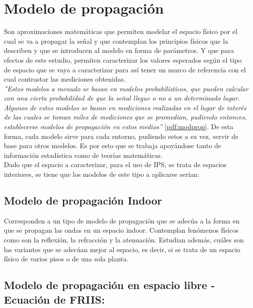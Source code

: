 \newpage 

\section{Modelo de propagación}

Son aproximaciones matemáticas que permiten modelar el espacio físico por el cual se va a propagar la señal y que contemplan los principios físicos que la describen y que se introducen al modelo en forma de parámetros. Y que para efectos de este estudio, permiten caracterizar los valores esperados según el tipo de espacio que se vaya a caracterizar para así tener un marco de referencia con el cual contrastar las mediciones obtenidas.\\

\textit{''Estos modelos a menudo se basan en modelos probabilísticos, que pueden calcular con una cierta probabilidad de que la señal llegue o no a un determinado lugar. Algunos de estos modelos se basan en mediciones realizadas en el lugar de interés de las cuales se toman miles de mediciones que se promedian, pudiendo entonces, establecerse modelos de propagación en estos medios''} \ref{pdf:modprop}. De esta forma, cada modelo sirve para cada entorno, pudiendo estos a su vez, servir de base para otros modelos. Es por esto que se trabaja apoyándose tanto de información estadística como de teorías matemáticas.\\

Dado que el espacio a caracterizar, para el uso de IPS, se trata de espacios interiores, se tiene que los modelos de este tipo a aplicarse serían:\\

\subsection{Modelo de propagación Indoor}

Corresponden a un tipo de modelo de propagación que se adecúa a la forma en que se propagan las ondas en un espacio indoor. Contemplan fenómenos físicos como son la reflexión, la refracción y la atenuación. Estudian además, cuáles son las variantes que se adecúan mejor al espacio, es decir, si se trata de un espacio físico de varios 
pisos o de una sola planta.\\

\subsection{Modelo de propagación en espacio libre - Ecuación de FRIIS:} 

